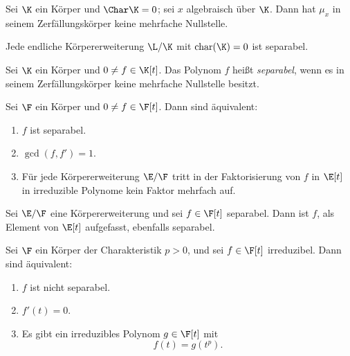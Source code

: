 \documentclass[11pt, a4paper]{article}
\begin{document}
\begin{lemma}
    Sei $\K$ ein Körper und $\Char \K = 0$; sei $x$ algebraisch über $\K$. Dann hat $\mu_x$ in seinem Zerfällungskörper keine mehrfache Nullstelle.
\end{lemma}

\begin{mdbox}
\begin{corollary} \Theorem
    Jede endliche Körpererweiterung $\L/\K$ mit $\mathrm{char}(\K) = 0$ ist separabel.
\end{corollary}
\end{mdbox}

\begin{definition} \Theorem
    Sei $\K$ ein Körper und $0 \neq f \in \K[t]$. Das Polynom $f$ heißt \emph{separabel}, wenn es in seinem Zerfällungskörper keine mehrfache Nullstelle besitzt.
\end{definition}

\begin{lemma}[Ableitungskriterium] \Theorem
    Sei $\F$ ein Körper und $0 \neq f \in \F[t]$. Dann sind äquivalent:
    \begin{enumerate}[label=(\roman*)]
        \item $f$ ist separabel.
        \item $\gcd(f,f') = 1$.
        \item Für jede Körpererweiterung $\E/\F$ tritt in der Faktorisierung von $f$ in $\E[t]$ in irreduzible Polynome kein Faktor mehrfach auf.
    \end{enumerate}
\end{lemma}

\begin{corollary}
    Sei $\E/\F$ eine Körpererweiterung und sei $f \in \F[t]$ separabel. Dann ist $f$, als Element von $\E[t]$ aufgefasst, ebenfalls separabel.
\end{corollary}

\begin{lemma} \label{lm: charakterisierung nicht separabilität}
    Sei $\F$ ein Körper der Charakteristik $p>0$, und sei $f \in \F[t]$ irreduzibel. Dann sind äquivalent:
    \begin{enumerate}[label=(\roman*)]
        \item $f$ ist nicht separabel.
        \item $f'(t) = 0$.
        \item Es gibt ein irreduzibles Polynom $g \in \F[t]$ mit
        $$f(t) = g(t^p).$$
    \end{enumerate}
\end{lemma}
\end{document}
